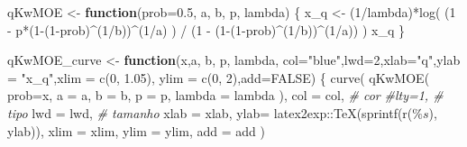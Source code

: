 \documentclass[
]{article}
\newenvironment{Shaded}{\begin{snugshade}}{\end{snugshade}}
\newcommand{\AttributeTok}[1]{\textcolor[rgb]{0.77,0.63,0.00}{#1}}
\newcommand{\CommentTok}[1]{\textcolor[rgb]{0.56,0.35,0.01}{\textit{#1}}}
\newcommand{\ConstantTok}[1]{\textcolor[rgb]{0.00,0.00,0.00}{#1}}
\newcommand{\ControlFlowTok}[1]{\textcolor[rgb]{0.13,0.29,0.53}{\textbf{#1}}}
\newcommand{\DecValTok}[1]{\textcolor[rgb]{0.00,0.00,0.81}{#1}}
\newcommand{\FloatTok}[1]{\textcolor[rgb]{0.00,0.00,0.81}{#1}}
\newcommand{\FunctionTok}[1]{\textcolor[rgb]{0.00,0.00,0.00}{#1}}
\newcommand{\NormalTok}[1]{#1}
\newcommand{\OtherTok}[1]{\textcolor[rgb]{0.56,0.35,0.01}{#1}}
\newcommand{\SpecialCharTok}[1]{\textcolor[rgb]{0.00,0.00,0.00}{#1}}
\newcommand{\StringTok}[1]{\textcolor[rgb]{0.31,0.60,0.02}{#1}}
\begin{document}
\begin{Shaded}
\begin{Highlighting}[]
\NormalTok{qKwMOE }\OtherTok{\textless{}{-}} \ControlFlowTok{function}\NormalTok{(}\AttributeTok{prob=}\FloatTok{0.5}\NormalTok{, a, b, p, lambda)}
\NormalTok{\{}
\NormalTok{    x\_q }\OtherTok{\textless{}{-}}\NormalTok{ (}\DecValTok{1}\SpecialCharTok{/}\NormalTok{lambda)}\SpecialCharTok{*}\FunctionTok{log}\NormalTok{( (}\DecValTok{1} \SpecialCharTok{{-}}\NormalTok{ p}\SpecialCharTok{*}\NormalTok{(}\DecValTok{1}\SpecialCharTok{{-}}\NormalTok{(}\DecValTok{1}\SpecialCharTok{{-}}\NormalTok{prob)}\SpecialCharTok{\^{}}\NormalTok{(}\DecValTok{1}\SpecialCharTok{/}\NormalTok{b))}\SpecialCharTok{\^{}}\NormalTok{(}\DecValTok{1}\SpecialCharTok{/}\NormalTok{a) ) }\SpecialCharTok{/}\NormalTok{ (}\DecValTok{1} \SpecialCharTok{{-}}\NormalTok{ (}\DecValTok{1}\SpecialCharTok{{-}}\NormalTok{(}\DecValTok{1}\SpecialCharTok{{-}}\NormalTok{prob)}\SpecialCharTok{\^{}}\NormalTok{(}\DecValTok{1}\SpecialCharTok{/}\NormalTok{b))}\SpecialCharTok{\^{}}\NormalTok{(}\DecValTok{1}\SpecialCharTok{/}\NormalTok{a)) )}
\NormalTok{    x\_q}
\NormalTok{\}}

\NormalTok{qKwMOE\_curve }\OtherTok{\textless{}{-}} \ControlFlowTok{function}\NormalTok{(x,a, b, p, lambda,}
                         \AttributeTok{col=}\StringTok{"blue"}\NormalTok{,}\AttributeTok{lwd=}\DecValTok{2}\NormalTok{,}\AttributeTok{xlab=}\StringTok{"q"}\NormalTok{,}\AttributeTok{ylab =} \StringTok{"x\_q"}\NormalTok{,}\AttributeTok{xlim =} \FunctionTok{c}\NormalTok{(}\DecValTok{0}\NormalTok{, }\FloatTok{1.05}\NormalTok{), }\AttributeTok{ylim =} \FunctionTok{c}\NormalTok{(}\DecValTok{0}\NormalTok{, }\DecValTok{2}\NormalTok{),}\AttributeTok{add=}\ConstantTok{FALSE}\NormalTok{) \{}
    \FunctionTok{curve}\NormalTok{(}
        \FunctionTok{qKwMOE}\NormalTok{(}
            \AttributeTok{prob=}\NormalTok{x,}
            \AttributeTok{a =}\NormalTok{ a,}
            \AttributeTok{b =}\NormalTok{ b,}
            \AttributeTok{p =}\NormalTok{ p,}
            \AttributeTok{lambda =}\NormalTok{ lambda}
\NormalTok{        ),}
        \AttributeTok{col =}\NormalTok{ col, }\CommentTok{\# cor}
        \CommentTok{\#lty=1, \# tipo}
        \AttributeTok{lwd =}\NormalTok{ lwd, }\CommentTok{\# tamanho}
        \AttributeTok{xlab =}\NormalTok{ xlab,}
        \AttributeTok{ylab=}\NormalTok{ latex2exp}\SpecialCharTok{::}\FunctionTok{TeX}\NormalTok{(}\FunctionTok{sprintf}\NormalTok{(r}\StringTok{\textquotesingle{}($\%s$)\textquotesingle{}}\NormalTok{, ylab)),}
        \AttributeTok{xlim =}\NormalTok{ xlim,}
        \AttributeTok{ylim =}\NormalTok{ ylim,}
        \AttributeTok{add =}\NormalTok{ add}
\NormalTok{    )}
    

\end{Highlighting}
\end{Shaded}
\end{document}

